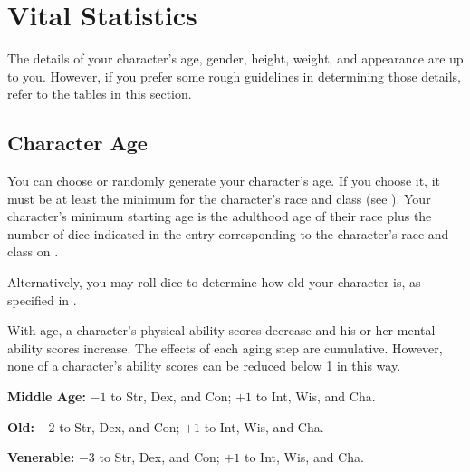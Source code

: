 \section{Vital Statistics}
The details of your character's age, gender, height, weight, and appearance are up to you. However, if you prefer some rough guidelines in determining those details, refer to the tables in this section.

\subsection{Character Age}
You can choose or randomly generate your character's age. If you choose it, it must be at least the minimum for the character's race and class (see ). Your character's minimum starting age is the adulthood age of their race plus the number of dice indicated in the entry corresponding to the character's race and class on .

Alternatively, you may roll dice to determine how old your character is, as specified in .


With age, a character's physical ability scores decrease and his or her mental ability scores increase. The effects of each aging step are cumulative. However, none of a character's ability scores can be reduced below 1 in this way.

\begin{itemize*}
\item \textbf{Middle Age:} $-1$ to Str, Dex, and Con; $+1$ to Int, Wis, and Cha.
\item \textbf{Old:} $-2$ to Str, Dex, and Con; $+1$ to Int, Wis, and Cha.
\item \textbf{Venerable:} $-3$ to Str, Dex, and Con; $+1$ to Int, Wis, and Cha.
\end{itemize*}

